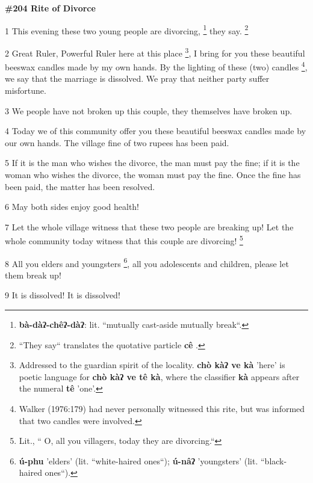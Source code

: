 
\textbf{\#204 Rite of Divorce}

1 This evening these two young people are divorcing, \footnote{\textbf{ bà-dàʔ-chêʔ-dàʔ}: lit. ``mutually cast-aside mutually break``.} they say. \footnote{``They say`` translates the quotative particle \textbf{cê} .}

2 Great Ruler, Powerful Ruler here at this place \footnote{Addressed to the guardian spirit of the locality. \textbf{chò kàʔ ve kà }'here' is poetic language for\textbf{  chò kàʔ ve tê kà}, where the classifier \textbf{kà} appears after the numeral\textbf{ tê} 'one'.}, I bring for you these beautiful
beeswax candles made by my own hands. By the lighting of these (two) candles \footnote{Walker (1976:179) had never personally witnessed this rite, but was informed that two candles were involved.},
we say that the marriage is dissolved. We pray that neither party suffer misfortune.

3 We people have not broken up this couple, they themselves have broken up.

4 Today we of this community offer you these beautiful beeswax candles made by
our own hands. The village fine of two rupees has been paid.

5 If it is the man who wishes the divorce, the man must pay the fine; if it is
the woman who wishes the divorce, the woman must pay the fine. Once the fine has
been paid, the matter has been resolved.

6 May both sides enjoy good health!

7 Let the whole village witness that these two people are breaking up!  Let the
whole community today witness that this couple are divorcing! \footnote{Lit., `` O, all you villagers, today they are divorcing.``}

8 All you elders and youngsters \footnote{\textbf{ú-phu}  'elders' (lit. ``white-haired ones``);  \textbf{ú-nâʔ} 'youngsters' (lit. ``black-haired ones``).},  all you adolescents and children, please
let them break up!

9 It is dissolved! It is dissolved!

